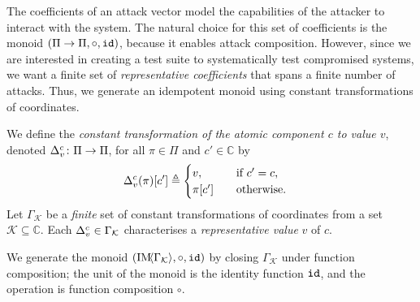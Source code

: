 {The coefficients of an attack vector model the capabilities of the attacker to interact with the system. The natural choice for this set of coefficients is the monoid $(\Pi\rightarrow \Pi, \circ, {\texttt{id}})$, because it enables attack composition. However, since we are interested in creating a test suite to systematically test compromised systems, we want a finite set of \emph{representative coefficients} that spans a finite number of attacks. Thus, we generate an {idempotent monoid} using constant transformations of coordinates.%

\begin{definition}
  \label{def:IdempotentMonoid}
We define the \emph{constant transformation of the atomic component $c$ to value $v$}, denoted ${\Delta}^{c}_{v}\colon \Pi\rightarrow \Pi$, for all $\pi \in \Pi$ and $c'\in \mathbb{C}$ by
  \begin{align}
    {\Delta}^{c}_{v}(\pi)[c']& \triangleq 
    \begin{cases}
     v, &\quad \text{if $c'=c$,}\\
     \pi[c']&\quad \text{otherwise.}
    \end{cases} 
  \end{align} 
Let $\Gamma_\mathcal{K}$ be a \emph{finite} set of constant transformations of coordinates from a set $\mathcal{K}\subseteq\mathbb{C}$. Each ${\Delta}^{c}_{v}\in \Gamma_\mathcal{K}$ characterises a \emph{representative value} $v$ of $c$.

We generate the monoid $(\text{IM}\!{{\left<\Gamma_{\mathcal{K}}\right>}},\circ,{\texttt{id}})$ %
by closing %
$\Gamma_{\mathcal{K}}$ under function composition; the unit of the monoid is the identity function ${\texttt{id}}$, and the operation is function composition $\circ$. 


\end{definition}}

